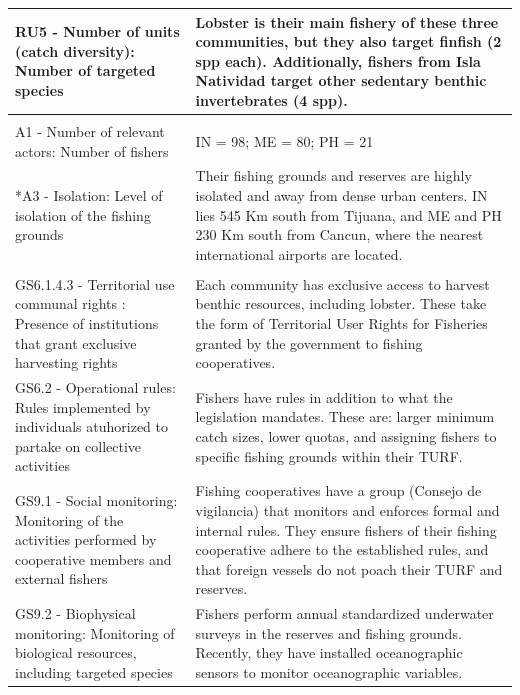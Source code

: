 \documentclass[10pt,letterpaper]{article}
\begin{document}
\begin{table}[!ht]
{\begin{tabular}{>{\raggedright\arraybackslash}p{6.5cm}|>{\raggedright\arraybackslash}p{12.2cm}}
\hline
\hspace{1em}RU5 - Number of units (catch diversity): Number of targeted species & Lobster is their main fishery of these three communities, but they also target finfish (2 spp each). Additionally, fishers from Isla Natividad target other sedentary benthic invertebrates (4 spp).\\
\hline
\multicolumn{2}{l}{\textbf{Actors (A)}}\\
\hline
\hspace{1em}A1 - Number of relevant actors: Number of fishers & IN = 98; ME = 80; PH = 21\\
\hline
\hspace{1em}*A3 - Isolation: Level of isolation of the fishing grounds & Their fishing grounds and reserves are highly isolated and away from dense urban centers. IN lies 545 Km south from Tijuana, and ME and PH 230 Km south from Cancun, where the nearest international airports are located.\\
\hline
\multicolumn{2}{l}{\textbf{Governance system (G)}}\\
\hline
\hspace{1em}GS6.1.4.3 - Territorial use communal rights : Presence of institutions that grant exclusive harvesting rights & Each community has exclusive access to harvest benthic resources, including lobster. These take the form of Territorial User Rights for Fisheries granted by the government to fishing cooperatives.\\
\hline
\hspace{1em}GS6.2 - Operational rules: Rules implemented by individuals atuhorized to partake on collective activities & Fishers have rules in addition to what the legislation mandates. These are: larger minimum catch sizes, lower quotas, and assigning fishers to specific fishing grounds within their TURF.\\
\hline
\hspace{1em}GS9.1 - Social monitoring: Monitoring of the activities performed by cooperative members and external fishers & Fishing cooperatives have a group (Consejo de vigilancia) that monitors and enforces formal and internal rules. They ensure fishers of their fishing cooperative adhere to the established rules, and that foreign vessels do not poach their TURF and reserves.\\
\hline
\hspace{1em}GS9.2 - Biophysical monitoring: Monitoring of biological resources, including targeted species & Fishers perform annual standardized underwater surveys in the reserves and fishing grounds. Recently, they have installed oceanographic sensors to monitor oceanographic variables.\\

\end{tabular}}
\end{table}
\end{document}
